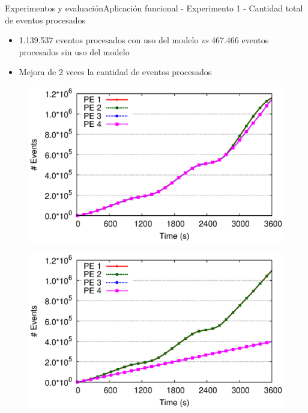 \begin{frame}{Experimentos y evaluación}{Aplicación funcional - Experimento 1 - Cantidad total de eventos procesados}

\begin{itemize}
\item 1.139.537 eventos procesados con uso del modelo \textit{vs} 467.466 eventos procesados sin uso del modelo
\item Mejora de 2 veces la cantidad de eventos procesados
\end{itemize}

\begin{multicols}{2}
\begin{figure}[p]
	\centering
	\includegraphics[scale=0.4]{images/exp/app1/dynamic/adaptative/exp1-eventCount.eps}
\end{figure}

\begin{figure}[p]
	\centering
	\includegraphics[scale=0.4]{images/exp/app1/dynamic/baseline/exp1-eventCount.eps}
\end{figure}
\end{multicols}
\end{frame}

